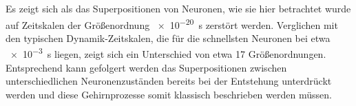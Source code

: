 Es zeigt sich als das Superpositionen von Neuronen, wie sie hier betrachtet wurde auf Zeitskalen der 
Größenordnung \SI{e-20}{s} zerstört werden. Verglichen mit den typischen Dynamik-Zeitskalen, die für 
die schnellsten Neuronen bei etwa \SI{e-3}{s} liegen, zeigt sich ein Unterschied von etwa 17 Größenordnungen.
Entsprechend kann gefolgert werden das Superpositionen zwischen unterschiedlichen Neuronenzuständen bereits 
bei der Entstehung unterdrückt werden und diese Gehirnprozesse somit klassisch beschrieben werden müssen. 
 
